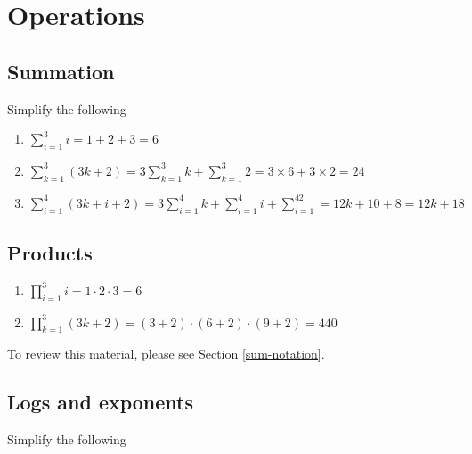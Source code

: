 \documentclass[
]{book}
\theoremstyle{definition}
\theoremstyle{definition}
\theoremstyle{definition}
\theoremstyle{remark}
\begin{document}
\hypertarget{operations-1}{%
\section*{Operations}\label{operations-1}}

\hypertarget{summation-1}{%
\subsection*{Summation}\label{summation-1}}

Simplify the following

\begin{enumerate}
\def\labelenumi{\arabic{enumi}.}
\item
  \(\sum\limits_{i = 1}^3 i = 1 + 2+ 3 = 6\)
\item
  \(\sum\limits_{k = 1}^3(3k + 2) = 3\sum\limits_{k=1}^3k + \sum\limits_{k=1}^3 2= 3\times 6 + 3\times 2 = 24\)
\item
  \(\sum\limits_{i= 1}^4 (3k + i + 2) = 3\sum\limits_{i= 1}^4k + \sum\limits_{i= 1}^4i + \sum\limits_{i= 1}^42 = 12k + 10 + 8 = 12k + 18\)
\end{enumerate}

\hypertarget{products-1}{%
\subsection*{Products}\label{products-1}}

\begin{enumerate}
\def\labelenumi{\arabic{enumi}.}
\item
  \(\prod\limits_{i= 1}^3 i = 1\cdot 2\cdot 3 = 6\)
\item
  \(\prod\limits_{k=1}^3(3k + 2) = (3 + 2)\cdot (6 + 2)\cdot (9 + 2) = 440\)
\end{enumerate}

To review this material, please see Section \ref{sum-notation}.

\hypertarget{logs-and-exponents-1}{%
\subsection*{Logs and exponents}\label{logs-and-exponents-1}}

Simplify the following
\end{document}
